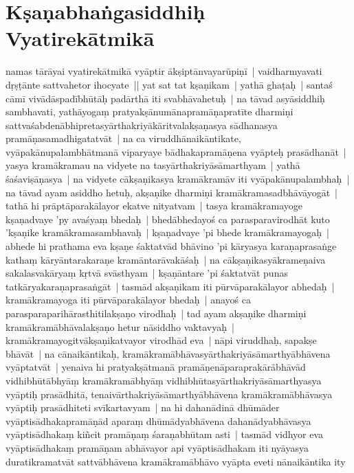 \documentclass[article,a4paper]{memoir}
\begin{document}
\section[{Kṣaṇabhaṅgasiddhiḥ Vyatirekā\-tmikā\-}]{Kṣaṇabhaṅgasiddhiḥ Vyatirekā\-tmikā\-}\label{Kṣaṇabhaṅgasiddhiḥ_Vyatirekātmikā}

	  \pstart namas tā\-rā\-yai \label{thakur75-83.6} vyatirekā\-tmikā\- vyā\-ptir ā\-kṣiptā\-nvayarū\-piṇī\- | vaidharmyavati dṛṣṭā\-nte sattvahetor ihocyate || \label{thakur75-83.8} yat sat tat kṣaṇikam | yathā\- ghaṭaḥ | santaś cā\-mī\- vivā\-dā\-spadī\-bhū\-tā\-ḥ padā\-rthā\- iti svabhā\-vahetuḥ | \label{thakur75-83.10} na tā\-vad asyā\-siddhiḥ sambhavati, yathā\-yogaṃ pratyakṣā\-numā\-napramā\-ṇapratī\-te dharmiṇi sattvaśabdenā\-bhipretasyā\-rthakriyā\-kā\-ritvalakṣaṇasya sā\-dhanasya pramā\-ṇasamadhigatatvā\-t | \label{thakur75-83.12} na ca viruddhā\-naikā\-ntikate, vyā\-pakā\-nupalambhā\-tmanā\- viparyaye bā\-dhakapramā\-ṇena vyā\-pteḥ prasā\-dhanā\-t | \label{thakur75-83.13} yasya kramā\-kramau na vidyete na tasyā\-rthakriyā\-sā\-marthyam | yathā\- śaśaviṣā\-ṇasya | na vidyete cā\-kṣaṇikasya kramā\-kramā\-v iti vyā\-pakā\-nupalambhaḥ | \label{thakur75-83.14} na tā\-vad ayam asiddho hetuḥ, akṣaṇike dharmiṇi kramā\-kramasadbhā\-vā\-yogā\-t | tathā\- hi prā\-ptā\-parakā\-layor ekatve nityatvam | tasya kramā\-kramayoge kṣaṇadvaye 'py avaśyaṃ bhedaḥ | bhedā\-bhedayoś ca parasparavirodhā\-t kuto 'kṣaṇike kramā\-kramasambhavaḥ | kṣaṇadvaye 'pi bhede kramā\-kramayogaḥ | abhede hi prathama eva kṣaṇe śaktatvā\-d bhā\-vino 'pi kā\-ryasya karaṇaprasaṅge kathaṃ kā\-ryā\-ntarakaraṇe kramā\-ntarā\-vakā\-śaḥ | na cā\-kṣaṇikasyā\-krameṇaiva sakalasvakā\-ryaṃ kṛtvā\- svā\-sthyam | kṣaṇā\-ntare 'pi śaktatvā\-t punas tatkā\-ryakaraṇaprasaṅgā\-t | \label{thakur75-83.21} tasmā\-d akṣaṇikam iti pū\-rvā\-parakā\-layor abhedaḥ | kramā\-kramayoga iti pū\-rvā\-parakā\-layor bhedaḥ | anayoś ca parasparaparihā\-rasthitilakṣaṇo virodhaḥ | \label{thakur75-83.23} tad ayam akṣaṇike dharmiṇi kramā\-kramā\-bhā\-valakṣaṇo hetur nā\-siddho vaktavyaḥ | kramā\-kramayogitvā\-kṣaṇikatvayor virodhā\-d eva | \label{thakur75-84.1} nā\-pi viruddhaḥ, sapakṣe bhā\-vā\-t | \label{thakur75-84.2} na cā\-naikā\-ntikaḥ, kramā\-kramā\-bhā\-vasyā\-rthakriyā\-sā\-marthyā\-bhā\-vena vyā\-ptatvā\-t | \label{thakur75-84.3} yenaiva hi pratyakṣā\-tmanā\- pramā\-ṇenā\-paraprakā\-rā\-bhā\-vā\-d vidhibhū\-tā\-bhyā\-ṃ kramā\-kramā\-bhyā\-ṃ vidhibhū\-tasyā\-rthakriyā\-sā\-marthyasya vyā\-ptiḥ prasā\-dhitā\-, tenaivā\-rthakriyā\-sā\-marthyā\-bhā\-vena kramā\-kramā\-bhā\-vasya vyā\-ptiḥ prasā\-dhiteti svī\-kartavyam | na hi dahanā\-dinā\- dhū\-mā\-der vyā\-ptisā\-dhakapramā\-ṇā\-d aparaṃ dhū\-mā\-dyabhā\-vena dahanā\-dyabhā\-vasya vyā\-ptisā\-dhakaṃ kiñcit pramā\-ṇaṃ śaraṇabhū\-tam asti | tasmā\-d vidhyor eva vyā\-ptisā\-dhakaṃ pramā\-ṇam abhā\-vayor api vyā\-ptisā\-dhakam iti nyā\-yasya duratikramatvā\-t sattvā\-bhā\-vena kramā\-kramā\-bhā\-vo vyā\-pta eveti nā\-naikā\-ntika ity 
\end{document}
